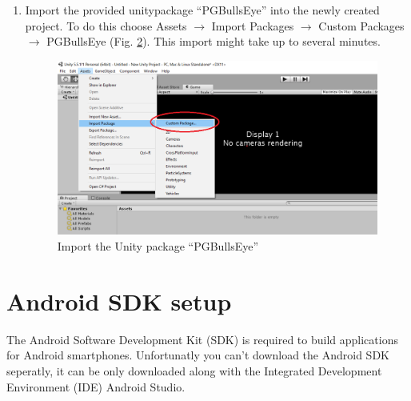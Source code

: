\documentclass[../../Installationguide_Unity_Pupil]{subfiles}
\begin{document}
\begin{enumerate}
\begin{figure}[htb]
	\caption{}
	\label{fig:pic4}
\end{figure}
\item Import the provided unitypackage ``PGBullsEye'' into the newly created project. To do this choose Assets $\rightarrow$ Import Packages $\rightarrow$ Custom Packages $\rightarrow$ PGBullsEye (Fig. \ref{fig:pic5}). This import might take up to several minutes.
	\begin{figure}[htb]
		\centering
		\includegraphics[width=0.95\linewidth]{img/pic5}
		\caption{Import the Unity package ``PGBullsEye''}
		\label{fig:pic5}
	\end{figure}	
\end{enumerate}
\clearpage

\section{Android SDK setup}
The Android Software Development Kit (SDK) is required to build applications for Android smartphones. Unfortunatly you can't download the Android SDK seperatly, it can be only downloaded along with the Integrated Development Environment (IDE) Android Studio.
\end{document}
